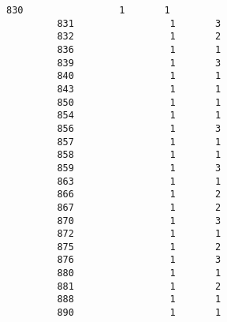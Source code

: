 \documentclass[11pt]{article}
\begin{document}
\begin{Verbatim}[commandchars=\\\{\}]
         830                 1       1   
         831                 1       3   
         832                 1       2   
         836                 1       1   
         839                 1       3   
         840                 1       1   
         843                 1       1   
         850                 1       1   
         854                 1       1   
         856                 1       3   
         857                 1       1   
         858                 1       1   
         859                 1       3   
         863                 1       1   
         866                 1       2   
         867                 1       2   
         870                 1       3   
         872                 1       1   
         875                 1       2   
         876                 1       3   
         880                 1       1   
         881                 1       2   
         888                 1       1   
         890                 1       1   
         

\end{Verbatim}
\end{document}
